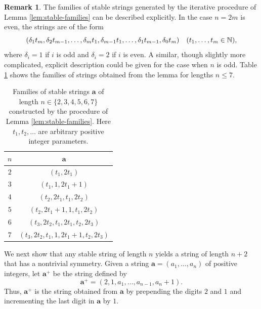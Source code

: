 \documentclass[10pt]{article}
\theoremstyle{definition}
\newtheorem{remark}[lemma]{Remark}
\numberwithin{equation}{section}
\numberwithin{lemma}{section}
\newcommand{\NN}{\mathbb{N}}
\newcommand{\bfa}{\mathbf{a}}
\newcommand{\bfap}{\bfa^+}
\begin{document}
\begin{remark}
\label{rem:explicit-stable-families}
The families of stable strings generated by the iterative procedure of
Lemma \ref{lem:stable-families} can be described explicitly. In the case
$n=2m$ is even, the strings are of the form
\begin{equation}
\notag
(\delta_1 t_m,\delta_2 t_{m-1},\dots,\delta_m t_1,
\delta_{m-1} t_1,\dots,\delta_{1} t_{m-1}, \delta_{0} t_m)
\quad (t_1,\dots,t_m\in\NN),
\end{equation}
where $\delta_i=1$ if $i$ is odd and  $\delta_i=2$ if $i$ is even.
A similar, though slightly more complicated,
explicit description could be given for the case when $n$ is odd.
Table \ref{table:stable-families} shows the families of strings obtained
from the lemma for lengths $n\le 7$.

\begin{table}[H]
\begin{center}
\addtolength{\tabcolsep}{6pt}
\renewcommand{\arraystretch}{1.5}
\begin{tabular}{|c|c|}
\hline
$n$& $\bfa$ 
\\
\hline
$2$ & $(t_1,2t_1)$ 
\\
$3$ & $(t_1,1, 2t_1+1)$
\\
$4$ & 
$(t_2,2t_1, t_1, 2t_2)$  
\\
$5$ &
$(t_2, 2t_1+1,1,t_1,2t_2)$
\\
$6$ &
$(t_3,2t_2,t_1,2t_1,t_2,2t_3)$
\\
$7$ &
$(t_3, 2t_2, t_1, 1, 2t_1+1, t_2, 2t_3)$
\\
\hline
\end{tabular}
\caption{Families of stable strings $\bfa$ of length
$n\in\{2,3,4,5,6,7\}$ constructed by the procedure
of Lemma \ref{lem:stable-families}. Here $t_1,t_2,\dots$ are arbitrary
positive integer parameters.} 
\label{table:stable-families} 
\end{center}
\end{table}
\end{remark}



We next show 
that any stable string of length $n$
yields a string of length $n+2$ that has a nontrivial symmetry.
Given a string $\bfa=(a_1,\dots,a_n)$ of positive integers, let $\bfap$
be the string defined by 
\begin{equation}
\label{eq:def-bfap}
\bfap=(2,1,a_1,\dots,a_{n-1},a_n+1).
\end{equation}
Thus, $\bfap$ is the string obtained from $\bfa$ by prepending the
digits $2$ and $1$ and incrementing the last digit in $\bfa$ by $1$.
\end{document}
